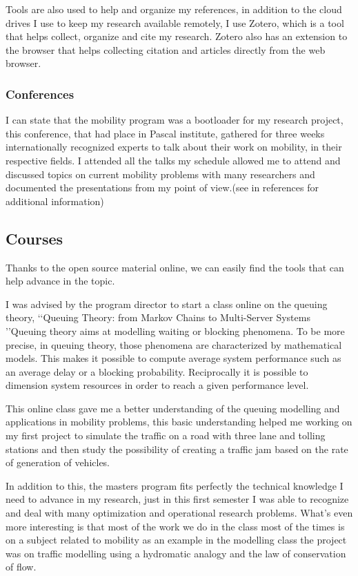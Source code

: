 \documentclass{article}
\begin{document}
Tools are also used to help and organize my references, in addition to the cloud drives I use to keep my research available remotely, I use Zotero, which is a tool that helps collect, organize and cite my research. Zotero also has an extension to the browser that helps collecting citation and articles directly from the web browser. 

\subsubsection{Conferences}

I can state that the mobility program was a bootloader for my research project, this conference, that had place in Pascal institute, gathered for three weeks internationally recognized experts to talk about their work on mobility, in their respective fields. I attended all the talks my schedule allowed me to attend and discussed topics on current mobility problems with many researchers and documented the presentations from my point of view.(see in references \cite{mobility_program} for additional information) 

  
\subsection{Courses}
\label{subsec:online}
Thanks to the open source material online, we can easily find the tools that can help advance in the topic.

I was advised by the program director to start a class online on the queuing theory, \lq\lq{Queuing Theory: from Markov Chains to Multi-Server Systems }\rq\rq Queuing theory aims at modelling waiting or blocking phenomena. To be more precise, in queuing theory, those phenomena are characterized by mathematical models. This makes it possible to compute average system performance such as an average delay or a blocking probability. Reciprocally it is possible to dimension system resources in order to reach a given performance level.

This online class gave me a better understanding of the queuing modelling and applications in mobility problems, this basic understanding helped me working on my first project to simulate the traffic on a road with three lane and tolling stations and then study the 
possibility of creating a traffic jam based on the rate of generation of vehicles.


In addition to this, the masters program fits perfectly the technical knowledge I need to advance in my research, just in this first semester I was able to recognize and deal with many optimization and operational research problems. 
What\rq{s} even more interesting is that most of the work we do in the class most of the times is on a subject related to mobility as an example in the modelling class the project was on traffic modelling using a hydromatic analogy and the law of conservation of flow.
\end{document}
